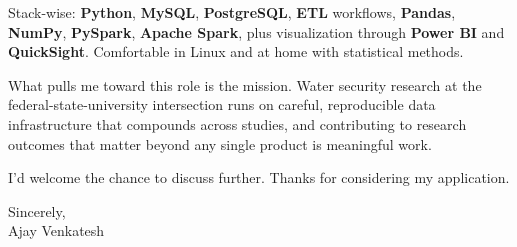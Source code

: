 \documentclass[letterpaper,11pt]{article}
\begin{document}
Stack-wise: \textbf{Python}, \textbf{MySQL}, \textbf{PostgreSQL}, \textbf{ETL} workflows, \textbf{Pandas}, \textbf{NumPy}, \textbf{PySpark}, \textbf{Apache Spark}, plus visualization through \textbf{Power BI} and \textbf{QuickSight}. Comfortable in Linux and at home with statistical methods.

What pulls me toward this role is the mission. Water security research at the federal-state-university intersection runs on careful, reproducible data infrastructure that compounds across studies, and contributing to research outcomes that matter beyond any single product is meaningful work.

I'd welcome the chance to discuss further. Thanks for considering my application.

\vspace{12pt}
Sincerely, \\
Ajay Venkatesh
\end{document}
